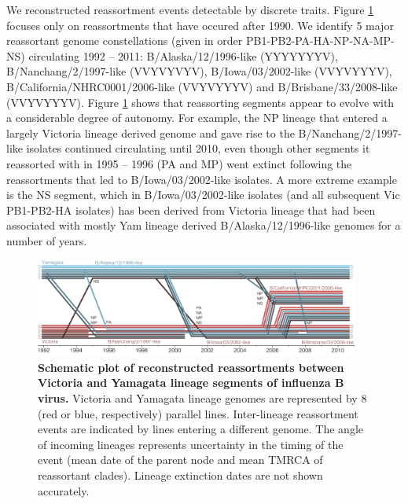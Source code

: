\documentclass[11pt,oneside,letterpaper]{article}
\begin{document}
We reconstructed reassortment events detectable by discrete traits.
Figure \ref{railroadPlot} focuses only on reassortments that have occured after 1990.
We identify 5 major reassortant genome constellations (given in order PB1-PB2-PA-HA-NP-NA-MP-NS) circulating 1992 -- 2011: B/Alaska/12/1996-like (YYYYYYYV), B/Nanchang/2/1997-like (VVYVYVYV), B/Iowa/03/2002-like (VVYVYYYV), B/California/NHRC0001/2006-like (VVYVYYYV) and B/Brisbane/33/2008-like (VVYVYYYV).
Figure \ref{railroadPlot} shows that reassorting segments appear to evolve with a considerable degree of autonomy.
For example, the NP lineage that entered a largely Victoria lineage derived genome and gave rise to the B/Nanchang/2/1997-like isolates continued circulating until 2010, even though other segments it reassorted with in 1995 -- 1996 (PA and MP) went extinct following the reassortments that led to B/Iowa/03/2002-like isolates.
A more extreme example is the NS segment, which in B/Iowa/03/2002-like isolates (and all subsequent Vic PB1-PB2-HA isolates) has been derived from Victoria lineage that had been associated with mostly Yam lineage derived B/Alaska/12/1996-like genomes for a number of years.

\begin{figure}
	\centering		
	\includegraphics[width=0.95\textwidth]{figures/RailroadPlotDated.pdf}
	\caption{\textbf{Schematic plot of reconstructed reassortments between Victoria and Yamagata lineage segments of influenza B virus.}
Victoria and Yamagata lineage genomes are represented by 8 (red or blue, respectively) parallel lines.
Inter-lineage reassortment events are indicated by lines entering a different genome.
The angle of incoming lineages represents uncertainty in the timing of the event (mean date of the parent node and mean TMRCA of reassortant clades).
Lineage extinction dates are not shown accurately.}
	\label{railroadPlot}
\end{figure}
\end{document}
